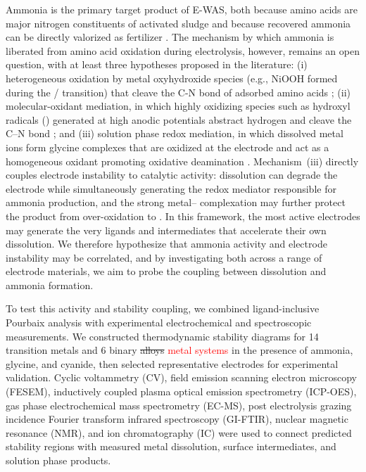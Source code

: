 \documentclass[twoside,twocolumn,9pt]{article}
\begin{document}
Ammonia is the primary target product of E-WAS, both because amino acids are major nitrogen constituents of activated sludge and because recovered ammonia can be directly valorized as fertilizer \cite{Jafari2022ElectrochemicalProduction}. The mechanism by which ammonia is liberated from amino acid oxidation during electrolysis, however, remains an open question, with at least three hypotheses proposed in the literature: (i) heterogeneous oxidation by metal oxyhydroxide species (e.g., NiOOH formed during the / transition) that cleave the C-N bond of adsorbed amino acids \cite{VEDHARATHINAM2012292}; (ii) molecular-oxidant mediation, in which highly oxidizing species such as hydroxyl radicals () generated at high anodic potentials abstract hydrogen and cleave the C--N bond \cite{Mahne_2017}; and (iii) solution phase redox mediation, in which dissolved metal ions form glycine complexes that are oxidized at the electrode and act as a homogeneous oxidant promoting oxidative deamination \cite{doi:10.1021/cr030717f,B409929J,doi:10.1021/jp803961s}. Mechanism~(iii) directly couples electrode instability to catalytic activity: dissolution can degrade the electrode while simultaneously generating the redox mediator responsible for ammonia production, and the strong metal-- complexation may further protect the product from over-oxidation to . In this framework, the most active electrodes may generate the very ligands and intermediates that accelerate their own dissolution. We therefore hypothesize that ammonia activity and electrode instability may be correlated, and by investigating both across a range of electrode materials, we aim to probe the coupling between dissolution and ammonia formation.

To test this activity and stability coupling, we combined ligand-inclusive Pourbaix analysis with experimental electrochemical and spectroscopic measurements. We constructed thermodynamic stability diagrams for 14 transition metals and 6 binary \sout{alloys} \textcolor{red}{metal systems} in the presence of ammonia, glycine, and cyanide, then selected representative electrodes for experimental validation. Cyclic voltammetry (CV), field emission scanning electron microscopy (FESEM), inductively coupled plasma optical emission spectrometry (ICP-OES), gas phase electrochemical mass spectrometry (EC-MS), post electrolysis grazing incidence Fourier transform infrared spectroscopy (GI-FTIR), nuclear magnetic resonance (NMR), and ion chromatography (IC) were used to connect predicted stability regions with measured metal dissolution, surface intermediates, and solution phase products.
\end{document}
